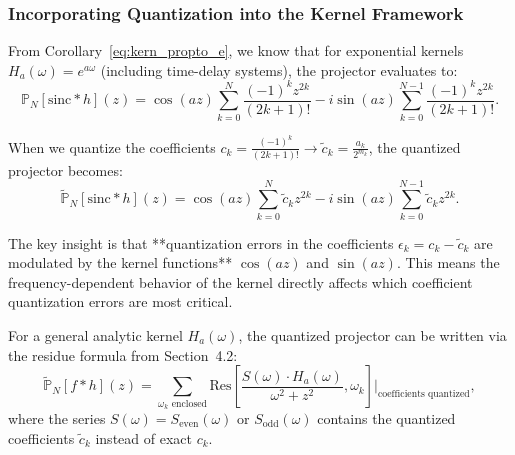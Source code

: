 \subsubsection{Incorporating Quantization into the Kernel Framework}

From Corollary~\ref{eq:kern_propto_e}, we know that for exponential kernels $H_a(\omega) = e^{a\omega}$ (including time-delay systems), the projector evaluates to:
\[
\mathbb{P}_N[\text{sinc} * h](z) = \cos(az)\sum_{k=0}^{N}\frac{(-1)^k z^{2k}}{(2k+1)!} - i\sin(az)\sum_{k=0}^{N-1}\frac{(-1)^k z^{2k}}{(2k+1)!}.
\]

When we quantize the coefficients $c_k = \frac{(-1)^k}{(2k+1)!} \to \widetilde{c}_k = \frac{a_k}{2^{m_k}}$, the quantized projector becomes:
\[
\widetilde{\mathbb{P}}_N[\text{sinc} * h](z) = \cos(az)\sum_{k=0}^{N}\widetilde{c}_k z^{2k} - i\sin(az)\sum_{k=0}^{N-1}\widetilde{c}_k z^{2k}.
\]

The key insight is that **quantization errors in the coefficients $\epsilon_k = c_k - \widetilde{c}_k$ are modulated by the kernel functions** $\cos(az)$ and $\sin(az)$. This means the frequency-dependent behavior of the kernel directly affects which coefficient quantization errors are most critical.

For a general analytic kernel $H_a(\omega)$, the quantized projector can be written via the residue formula from Section~4.2:
\begin{equation}
\widetilde{\mathbb{P}}_N[f * h](z) = \sum_{\omega_k \text{ enclosed}} \text{Res}\left[\frac{S(\omega) \cdot H_a(\omega)}{\omega^2+z^2}, \omega_k\right] \bigg|_{\text{coefficients quantized}},
\label{eq:quantized_residue}
\end{equation}
where the series $S(\omega) = S_{\text{even}}(\omega)$ or $S_{\text{odd}}(\omega)$ contains the quantized coefficients $\widetilde{c}_k$ instead of exact $c_k$.

